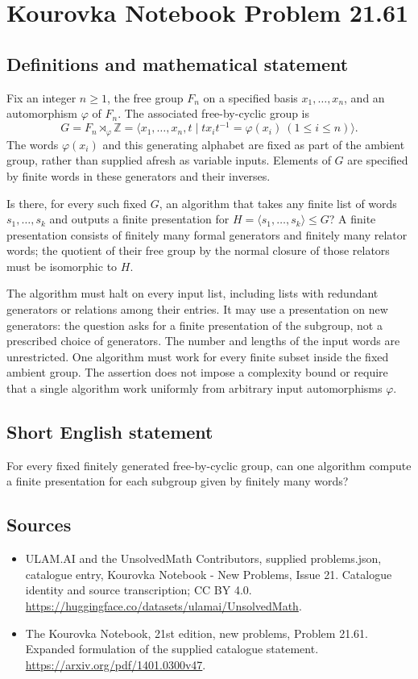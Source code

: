 \documentclass[11pt,a4paper]{article}
\begin{document}
\section*{Kourovka Notebook Problem 21.61}\label{statement}

\subsection{Definitions and mathematical statement}
Fix an integer $n\ge1$, the free group $F_n$ on a specified basis
$x_1,\ldots,x_n$, and an automorphism $\varphi$ of $F_n$.
The associated free-by-cyclic group is
\[
 G=F_n\rtimes_\varphi\mathbb Z
   =\langle x_1,\ldots,x_n,t\mid
       tx_it^{-1}=\varphi(x_i)\ (1\le i\le n)\rangle.
\]
The words $\varphi(x_i)$ and this generating alphabet are fixed as
part of the ambient group, rather than supplied afresh as variable
inputs. Elements of $G$ are specified by finite words in these
generators and their inverses.

Is there, for every such fixed $G$, an algorithm that takes any finite
list of words $s_1,\ldots,s_k$ and outputs a finite presentation for
$H=\langle s_1,\ldots,s_k\rangle\le G$? A finite presentation consists
of finitely many formal generators and finitely many relator words;
the quotient of their free group by the normal closure of those
relators must be isomorphic to $H$.

The algorithm must halt on every input list, including lists with
redundant generators or relations among their entries. It may use a
presentation on new generators: the question asks for a finite
presentation of the subgroup, not a prescribed choice of generators.
The number and lengths of the input words are unrestricted.
One algorithm must work for every finite subset inside the fixed
ambient group. The assertion does not impose a complexity bound or
require that a single algorithm work uniformly from arbitrary input
automorphisms $\varphi$.
\subsection{Short English statement}
For every fixed finitely generated free-by-cyclic group, can one algorithm compute a finite presentation for each subgroup given by finitely many words?
\subsection{Sources}
\begin{itemize}
\item[S1] ULAM.AI and the UnsolvedMath Contributors, supplied problems.json, catalogue entry, Kourovka Notebook - New Problems, Issue 21. Catalogue identity and source transcription; CC BY 4.0.
\url{https://huggingface.co/datasets/ulamai/UnsolvedMath}.
\item[S2] The Kourovka Notebook, 21st edition, new problems, Problem 21.61. Expanded formulation of the supplied catalogue statement.
\url{https://arxiv.org/pdf/1401.0300v47}.
\end{itemize}
\end{document}
